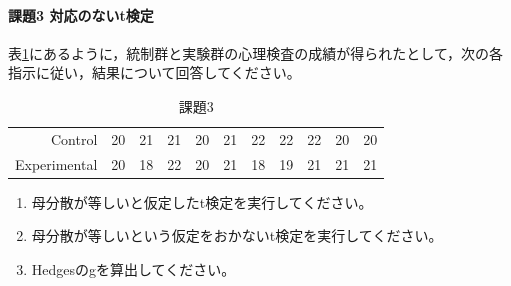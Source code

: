 \documentclass{ltjsbook}
\begin{document}
\paragraph{課題3 対応のないt検定}
表\ref{exe:20_3}にあるように，統制群と実験群の心理検査の成績が得られたとして，次の各指示に従い，結果について回答してください。
\begin{table}[ht]
\centering
    \caption{課題3}
    \label{exe:20_3}
    \begin{tabular}{rrrrrrrrrrr}
  \hline
    Control & 20 & 21 & 21 & 20 & 21 & 22 & 22 & 22 & 20 & 20 \\ 
  Experimental & 20 & 18 & 22 & 20 & 21 & 18 & 19 & 21 & 21 & 21 \\ 
   \hline
\end{tabular}
\end{table}

\begin{enumerate}
     \item 母分散が等しいと仮定したt検定を実行してください。
     \item 母分散が等しいという仮定をおかないt検定を実行してください。
     \item Hedgesのgを算出してください。
\end{enumerate}
\end{document}
